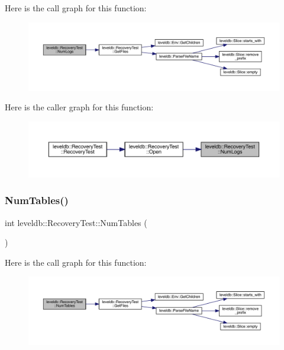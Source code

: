 Here is the call graph for this function\+:
\nopagebreak
\begin{figure}[H]
\begin{center}
\leavevmode
\includegraphics[width=350pt]{classleveldb_1_1_recovery_test_af02345905fe0db242ae9d68c2536cc4b_cgraph}
\end{center}
\end{figure}
Here is the caller graph for this function\+:
\nopagebreak
\begin{figure}[H]
\begin{center}
\leavevmode
\includegraphics[width=350pt]{classleveldb_1_1_recovery_test_af02345905fe0db242ae9d68c2536cc4b_icgraph}
\end{center}
\end{figure}
\mbox{\label{classleveldb_1_1_recovery_test_a3113da156897fffafda29b83b1f08baa}} 
\subsubsection{\texorpdfstring{NumTables()}{NumTables()}}
{\footnotesize\ttfamily int leveldb\+::\+Recovery\+Test\+::\+Num\+Tables (\begin{DoxyParamCaption}{ }\end{DoxyParamCaption})\hspace{0.3cm}{\ttfamily [inline]}}

Here is the call graph for this function\+:
\nopagebreak
\begin{figure}[H]
\begin{center}
\leavevmode
\includegraphics[width=350pt]{classleveldb_1_1_recovery_test_a3113da156897fffafda29b83b1f08baa_cgraph}
\end{center}
\end{figure}
\mbox{\label{classleveldb_1_1_recovery_test_ada3cbb27c8b7dd9eb4e0be43a476bb2e}} 
